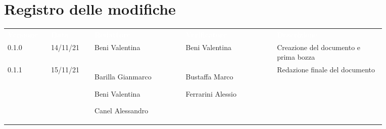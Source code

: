 \section*{Registro delle modifiche}

{\renewcommand{\arraystretch}{1.5}
\begin{tabular}{p{0.10\linewidth}p{0.10\linewidth}p{0.21\linewidth}p{0.21\linewidth}p{0.25\linewidth}}
	\rowcolor[RGB]{33, 73, 50}
	\textcolor{white}{\textbf{Versione}} & \textcolor{white}{\textbf{Data}} & \textcolor{white}
	{\textbf{Redattore}} & \textcolor{white}{\textbf{Verificatore}} & \textcolor{white}
	{\textbf{Descrizione}}\\
	\rowcolor[RGB]{216, 235, 171}
	0.1.0 & 14/11/21 & Beni Valentina & Beni Valentina & Creazione del documento e prima bozza\\
	\rowcolor[RGB]{233, 245, 206}
	0.1.1 & 15/11/21 & Barilla Gianmarco \par  Beni Valentina  \par Canel Alessandro & Bustaffa Marco \par Ferrarini Alessio & Redazione finale del documento\\
	
\end{tabular}	
}